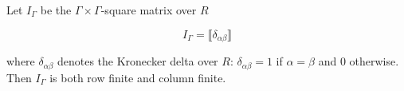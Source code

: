 Let $I_{\Gamma}$ be the $\Gamma \times \Gamma$-square matrix over $R$

$$I_{\Gamma} = \llbracket \delta_{\alpha\beta} \rrbracket$$

where $\delta_{\alpha\beta}$ denotes the Kronecker delta over $R$: $\delta_{\alpha\beta} = 1$ if $\alpha = \beta$ and $0$ otherwise. Then $I_{\Gamma}$ is both row finite and column finite.
